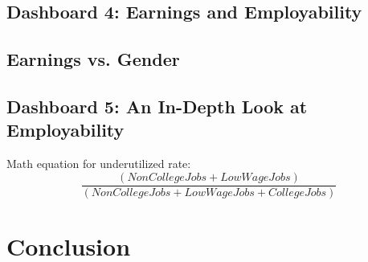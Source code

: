 \documentclass[sigchi]{acmart}
\providecommand\BibTeX{{%
    \normalfont B\kern-0.5em{\scshape i\kern-0.25em b}\kern-0.8em\TeX}}}
\begin{document}
\subsection{Dashboard 4: Earnings and Employability}
\label{sec:db4}

\subsection{Earnings vs. Gender}
\label{sec:earningsgender}

\subsection{Dashboard 5: An In-Depth Look at Employability}
\label{sec:db5}

Math equation for underutilized rate:
\begin{displaymath}
  \frac{(NonCollegeJobs + LowWageJobs)}{(NonCollegeJobs + LowWageJobs + CollegeJobs)}
\end{displaymath}

\section{Conclusion}




%   
%   

\end{document}

